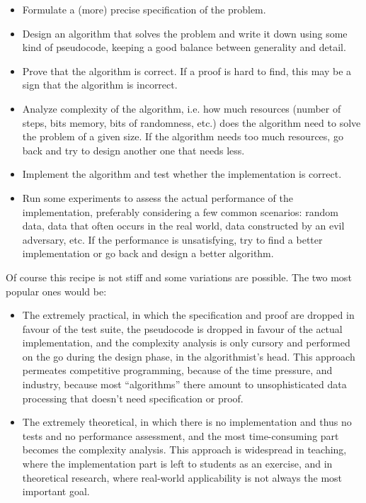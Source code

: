 \documentclass[declaration,mgr,english,shortabstract]{iithesis}
\begin{document}
\begin{itemize}
    \item Formulate a (more) precise specification of the problem.
    \item Design an algorithm that solves the problem and write it down using some kind of pseudocode, keeping a good balance between generality and detail.
    \item Prove that the algorithm is correct. If a proof is hard to find, this may be a sign that the algorithm is incorrect.
    \item Analyze complexity of the algorithm, i.e. how much resources (number of steps, bits memory, bits of randomness, etc.) does the algorithm need to solve the problem of a given size. If the algorithm needs too much resources, go back and try to design another one that needs less.
    \item Implement the algorithm and test whether the implementation is correct.
    \item Run some experiments to assess the actual performance of the implementation, preferably considering a few common scenarios: random data, data that often occurs in the real world, data constructed by an evil adversary, etc. If the performance is unsatisfying, try to find a better implementation or go back and design a better algorithm.
\end{itemize}

Of course this recipe is not stiff and some variations are possible. The two most popular ones would be:

\begin{itemize}
    \item The extremely practical, in which the specification and proof are dropped in favour of the test suite, the pseudocode is dropped in favour of the actual implementation, and the complexity analysis is only cursory and performed on the go during the design phase, in the algorithmist's head. This approach permeates competitive programming, because of the time pressure, and industry, because most ``algorithms'' there amount to unsophisticated data processing that doesn't need specification or proof.
    \item The extremely theoretical, in which there is no implementation and thus no tests and no performance assessment, and the most time-consuming part becomes the complexity analysis. This approach is widespread in teaching, where the implementation part is left to students as an exercise, and in theoretical research, where real-world applicability is not always the most important goal.
\end{itemize}
\end{document}
